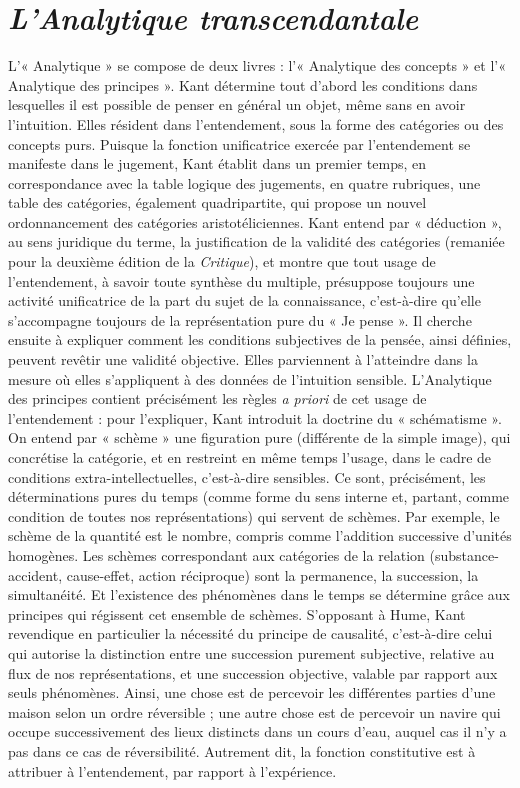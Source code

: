 
\section{{\it L’Analytique transcendantale}}


L’« Analytique » se compose de deux
livres : l’« Analytique des concepts » et
l’« Analytique des principes ». Kant
détermine tout d’abord les conditions
dans lesquelles il est possible de penser
en général un objet, même sans en avoir
l'intuition. Elles résident dans l’entendement,
sous la forme des catégories ou des
concepts purs. Puisque la fonction unificatrice
exercée par l’entendement se manifeste
dans le jugement, Kant établit dans
un premier temps, en correspondance
avec la table logique des jugements, en
quatre rubriques, une table des catégories,
également quadripartite, qui propose
un nouvel ordonnancement des catégories
aristotéliciennes. Kant entend par « déduction »,
au sens juridique du terme, la
justification de la validité des catégories
(remaniée pour la deuxième édition de la
{\it Critique}), et montre que tout usage de
l’entendement, à savoir toute synthèse du
multiple, présuppose toujours une activité
unificatrice de la part du sujet de la
connaissance, c’est-à-dire qu’elle s’accompagne
toujours de la représentation pure
du « Je pense ». Il cherche ensuite à expliquer
comment les conditions subjectives
de la pensée, ainsi définies, peuvent revêtir
une validité objective. Elles parviennent
à l’atteindre dans la mesure où elles
s’appliquent à des données de l'intuition
sensible. L’Analytique des principes
contient précisément les règles {\it a priori} de
cet usage de l’entendement : pour l’expliquer,
Kant introduit la doctrine du « schématisme ».
On entend par « schème » une
figuration pure (différente de la simple
image), qui concrétise la catégorie, et en
restreint en même temps l’usage, dans le
cadre de conditions extra-intellectuelles,
c’est-à-dire sensibles. Ce sont, précisément,
les déterminations pures du temps
(comme forme du sens interne et, partant,
comme condition de toutes nos représentations)
qui servent de schèmes. Par
exemple, le schème de la quantité est le
nombre, compris comme l’addition successive
d’unités homogènes. Les schèmes correspondant
aux catégories de la relation
(substance-accident, cause-effet, action
réciproque) sont la permanence, la succession,
la simultanéité. Et l’existence des
phénomènes dans le temps se détermine
grâce aux principes qui régissent cet
ensemble de schèmes. S’opposant à
Hume, Kant revendique en particulier la
nécessité du principe de causalité, c’est-à-dire
celui qui autorise la distinction entre
une succession purement subjective, relative
au flux de nos représentations, et une
succession objective, valable par rapport
aux seuls phénomènes. Ainsi, une chose
est de percevoir les différentes parties
d’une maison selon un ordre réversible ;
une autre chose est de percevoir un navire
qui occupe successivement des lieux distincts
dans un cours d’eau, auquel cas il
n'y a pas dans ce cas de réversibilité.
Autrement dit, la fonction constitutive est
à attribuer à l’entendement, par rapport à
l'expérience.

